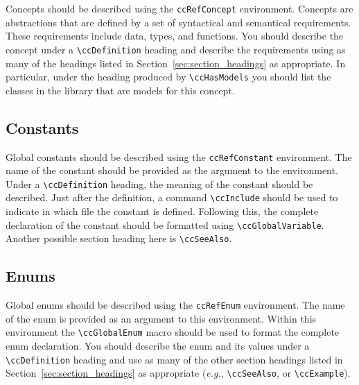 Concepts should be described using the {\tt ccRefConcept} environment. 
Concepts are abstractions that are defined by a set of syntactical and
semantical requirements.  These requirements include data, types, and functions.
You should describe the concept under a \verb|\ccDefinition|
heading and describe the requirements using as many of the headings listed
in Section~\ref{sec:section_headings} as appropriate.  In particular, under
the heading produced by  \verb|\ccHasModels| you should list  the classes
in the library that are models for this concept.

\subsection{Constants}
\label{sec:ref_constant}

Global constants should be described using the 
{\tt ccRefConstant} environment.
The name of the constant
should be provided as the argument to the environment.  Under a
\verb|\ccDefinition| heading, the meaning of the constant
should be described.  Just after the definition, a command 
\verb|\ccInclude| should be used to indicate in which file the constant
is defined.  Following this, the complete declaration of the constant
should be formatted using \verb|\ccGlobalVariable|.
Another possible section heading here is \verb|\ccSeeAlso|.

\subsection{Enums}
\label{sec:ref_enums}

Global enums should be described using the {\tt ccRefEnum} environment.
The name of the enum is provided as an argument to this environment.
Within this environment the \verb|\ccGlobalEnum| macro should be used to
format the complete enum declaration.  You should describe the enum and
its values under a \verb|\ccDefinition| heading and use as many of the 
other section headings listed in Section~\ref{sec:section_headings} as 
appropriate ({\em e.g.}, \verb|\ccSeeAlso|, or \verb|\ccExample|).

